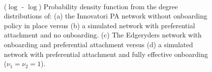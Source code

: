 \documentclass{article}
\begin{document}
\begin{figure}
\\
\caption{($\log$ - $\log$) Probability density function from the degree distributions of: (a) the Innovatori PA network without onboarding policy in place versus (b) a simulated network with preferential attachment and no onboarding.
(c) The Edgeryders network with onboarding and preferential attachment versus (d) a simulated network with preferential attachment and fully effective onboarding ($\nu_1 = \nu_2 = 1$).\vspace{-.5cm}}
 \label{fig:PDFViz}
\end{figure}
\end{document}
